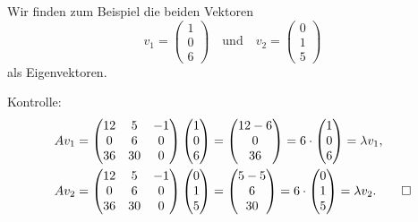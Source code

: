 \begin{loesung}
Wir finden zum Beispiel die beiden Vektoren
\[
v_1
=
\begin{pmatrix}1\\0\\6\end{pmatrix}
\quad\text{und}\quad
v_2
=
\begin{pmatrix}0\\1\\5\end{pmatrix}
\]
als Eigenvektoren.

Kontrolle:
\begin{align*}
Av_1
&=
\begin{pmatrix}
12& 5&-1\\
 0& 6& 0\\
36&30& 0
\end{pmatrix}
\begin{pmatrix}1\\0\\6\end{pmatrix}
=
\begin{pmatrix}
12-6\\
0\\
36
\end{pmatrix}
=
6\cdot
\begin{pmatrix}1\\0\\6\end{pmatrix}
=
\lambda v_1,
\\
Av_2
&=
\begin{pmatrix}
12& 5&-1\\
 0& 6& 0\\
36&30& 0
\end{pmatrix}
\begin{pmatrix}0\\1\\5\end{pmatrix}
=
\begin{pmatrix}
5-5\\
6\\
30
\end{pmatrix}
=
6\cdot
\begin{pmatrix}0\\1\\5\end{pmatrix}
=
\lambda v_2.
\qedhere
\end{align*}
\end{loesung}
